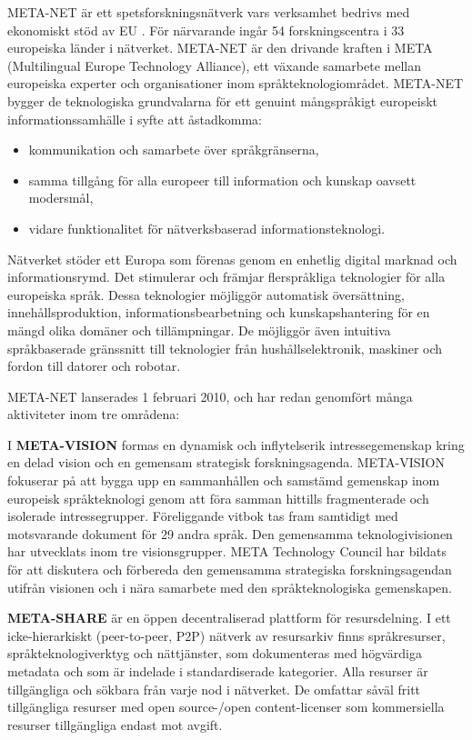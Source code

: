 \begin{multicols}{2}

META-NET är ett spets\-forsk\-nings\-nätverk vars verksamhet bedrivs
med ekonomiskt stöd av EU \cite{rehm2011}. För närvarande ingår 54
forsk\-nings\-centra i 33 europeiska länder i nätverket. META-NET är
den drivande kraften i META (Multilingual Europe Technology Alliance),
ett växande samarbete mellan europeiska experter och organisationer
inom språkteknologi\-området.  META-NET bygger de teknologiska
grundvalarna för ett genuint mångspråkigt europeiskt
informations\-samhälle i syfte att åstadkomma:

\begin{itemize}
\item kommunikation och samarbete över språkgränserna,
\item samma tillgång för alla europeer till information och kunskap oavsett modersmål,
\item vidare funktionalitet för nätverksbaserad informationsteknologi.
\end{itemize}

Nätverket stöder ett Europa som förenas genom en enhetlig digital
marknad och informationsrymd. Det stimulerar och främjar flerspråkliga
teknologier för alla europeiska språk. Dessa teknologier möjliggör
automatisk översättning, innehållsproduktion, informationsbearbetning
och kunskapshantering för en mängd olika domäner och tillämpningar. De
möjliggör även intuitiva språkbaserade gränssnitt till teknologier
från hus\-hålls\-elek\-tro\-nik, maskiner och fordon till datorer och robotar.

META-NET lanserades 1 februari 2010, och har redan genomfört många
aktiviteter inom tre områdena: %

I \textbf{META-VISION} formas en dynamisk och inflytelserik
intressegemenskap kring en delad vision och en gemensam strategisk
forskningsagenda. META-VISION fokuserar på att bygga upp en
sammanhållen och samstämd gemenskap inom europeisk språkteknologi
genom att föra samman hittills fragmenterade och isolerade
intressegrupper. Föreliggande vitbok tas fram samtidigt med
motsvarande dokument för 29 andra språk.  Den gemensamma
teknologivisionen har utvecklats inom tre visionsgrupper. META
Technology Council har bildats för att diskutera och förbereda den
gemensamma strategiska forskningsagendan utifrån visionen och i nära
samarbete med den språkteknologiska gemenskapen.

\textbf{META-SHARE} är en öppen decentraliserad plattform för
resursdelning. I ett icke-hierarkiskt (peer-to-peer, P2P) nätverk av
resursarkiv finns språkresurser, språkteknologiverktyg och
nättjänster, som dokumenteras med högvärdiga metadata och som är
indelade i standardiserade kategorier. Alla resurser är tillgängliga
och sökbara från varje nod i nätverket. De omfattar såväl fritt
tillgängliga resurser med open source-/open content-licenser som
kommersiella resurser tillgängliga endast mot avgift. 


\end{multicols}
